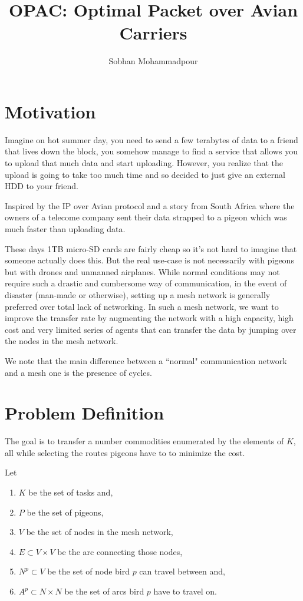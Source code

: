 \documentclass{article}
\author{Sobhan Mohammadpour}
\title{OPAC: Optimal Packet over Avian Carriers}
\begin{document}
	\maketitle
	\section{Motivation}
	
	Imagine on hot summer day, you need to send a few terabytes of data to a friend that lives down the block, you somehow manage to find a service that allows you to upload that much data and start uploading. However, you realize that the upload is going to take too much time and so decided to just give an external HDD to your friend.
	
	
	Inspired by the IP over Avian protocol  and a story from South Africa \autocite{abellAfricaPigeonTransfers} where the owners of a telecome company sent their data strapped to a pigeon which was much faster than uploading data. 
	
	These days 1TB micro-SD cards are fairly cheap so it's not hard to imagine that someone actually does this. But the real use-case is not necessarily with pigeons but with drones and unmanned airplanes. While normal conditions may not require such a drastic and cumbersome way of communication, in the event of disaster (man-made or otherwise), setting up a mesh network is generally preferred over total lack of networking. In such a mesh network, we want to improve the transfer rate by augmenting the network with a high capacity, high cost and very limited series of agents that can transfer the data by jumping over the nodes in the mesh network.
	
	We note that the main difference between a ``normal" communication network and a mesh one is the presence of cycles.
	
	\section{Problem Definition}
	The goal is to transfer a number commodities enumerated by the elements of $K$, all while selecting the routes pigeons have to to minimize the cost.
	
	
	Let
	\begin{enumerate}
			\item $K$ be the set of tasks and,
		\item $P$ be the set of pigeons,
		\item $V$ be the set of nodes in the mesh network,
		\item $E \subset V \times V$ be the arc connecting those nodes,
		\item $N^p \subset V$ be the set of node bird $p$ can travel between and,
		\item $A^p \subset N\times N$ be the set of arcs bird $p$ have to travel on.
	\end{enumerate}
\end{document}
